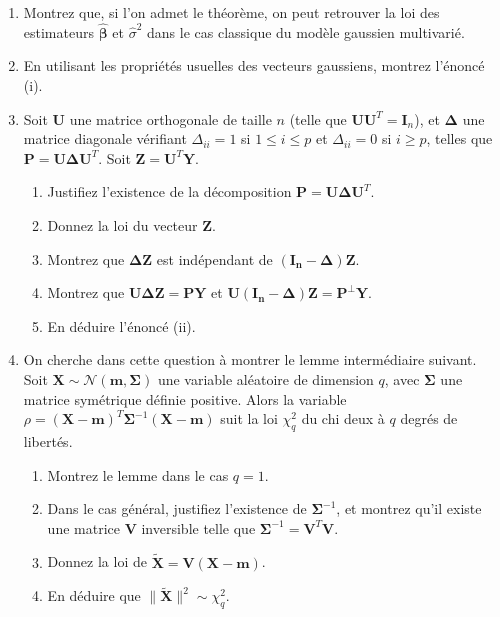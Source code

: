 \documentclass{../headers/td_upc}
\providecommand{\1}{\mathds{1}}
\begin{document}
	\begin{enumerate}
		\item Montrez que, si l'on admet le théorème, on peut retrouver la loi des
		estimateurs $\hat{\boldsymbol{\beta}}$ et $\hat{\sigma}^2$ dans le cas classique
		du modèle gaussien multivarié.
		\item En utilisant les propriétés usuelles des vecteurs gaussiens, montrez l'énoncé (i).
		\item Soit $\mathbf{U}$ une matrice orthogonale de taille $n$ 
		(telle que $\mathbf{U}\mathbf{U}^T = \mathbf{I}_n$), 
		et $\mathbf{\Delta}$ une matrice diagonale vérifiant $\Delta_{ii} = 1$ si $1 \leq i \leq p$
		et $\Delta_{ii} = 0$ si $i \geq p$, telles que $\mathbf{P} = \mathbf{U}\mathbf{\Delta}\mathbf{U}^T$.
		Soit $\mathbf{Z} = \mathbf{U}^T\mathbf{Y}$. 
		\begin{enumerate}
		\item Justifiez l'existence de la décomposition $\mathbf{P} = \mathbf{U}\mathbf{\Delta}\mathbf{U}^T$.
		\item Donnez la loi du vecteur $\mathbf{Z}$.
		\item Montrez que $\mathbf{\Delta}\mathbf{Z}$ est indépendant de $(\mathbf{I_n} - \mathbf{\Delta})\mathbf{Z}$.
		\item Montrez que $\mathbf{U}\mathbf{\Delta}\mathbf{Z} = \mathbf{P} \mathbf{Y}$ 
		et $\mathbf{U}(\mathbf{I_n} - \mathbf{\Delta})\mathbf{Z} = \mathbf{P}^{\bot} \mathbf{Y}$.
		\item En déduire l'énoncé (ii).
		\end{enumerate}
		\item On cherche dans cette question à montrer le lemme intermédiaire suivant.
		Soit $\mathbf{X} \sim \mathcal{N}(\mathbf{m}, \mathbf{\Sigma})$
		une variable aléatoire de dimension $q$, avec $\mathbf{\Sigma}$ une matrice symétrique
		définie positive. Alors la variable $\rho = (\mathbf{X} - \mathbf{m})^T \mathbf{\Sigma}^{-1}(\mathbf{X} - \mathbf{m})$
		suit la loi $\chi^2_q$ du chi deux à $q$ degrés de libertés.
		\begin{enumerate}
		\item Montrez le lemme dans le cas $q = 1$.
		\item Dans le cas général, justifiez l'existence de $\mathbf{\Sigma}^{-1}$,
		et montrez qu'il existe une matrice $\mathbf{V}$ inversible telle 
		que $\mathbf{\Sigma}^{-1} = \mathbf{V}^T\mathbf{V}$.
		\item Donnez la loi de $\tilde{\mathbf{X}} = \mathbf{V}(\mathbf{X} - \mathbf{m})$.
		\item En déduire que $\|\tilde{\mathbf{X}}\|^2 \sim \chi^2_q$.

\end{enumerate}
\end{enumerate}
\end{document}

